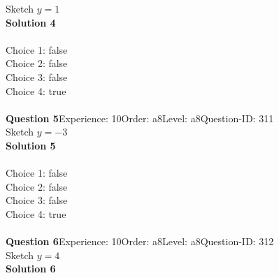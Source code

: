 \documentclass{article}
\begin{document}
Sketch $y=1$\\[4pt]
\noindent\textbf{Solution 4}\\[2pt]
\\[4pt]
Choice 1: \hspace{20pt} \hspace{20pt}false\\
Choice 2: \hspace{20pt} \hspace{20pt}false\\
Choice 3: \hspace{20pt} \hspace{20pt}false\\
Choice 4: \hspace{20pt} \hspace{20pt}true\\
\\[4pt]
\noindent\textbf{Question 5}\hspace{20pt}Experience: 10\hspace{20pt}Order: a8\hspace{20pt}Level: a8\hspace{20pt}Question-ID: 311\\[2pt]
Sketch $y=-3$\\[4pt]
\noindent\textbf{Solution 5}\\[2pt]
\\[4pt]
Choice 1: \hspace{20pt} \hspace{20pt}false\\
Choice 2: \hspace{20pt} \hspace{20pt}false\\
Choice 3: \hspace{20pt} \hspace{20pt}false\\
Choice 4: \hspace{20pt} \hspace{20pt}true\\
\\[4pt]
\noindent\textbf{Question 6}\hspace{20pt}Experience: 10\hspace{20pt}Order: a8\hspace{20pt}Level: a8\hspace{20pt}Question-ID: 312\\[2pt]
Sketch $y=4$\\[4pt]
\noindent\textbf{Solution 6}\\[2pt]
\\[4pt]
\end{document}
